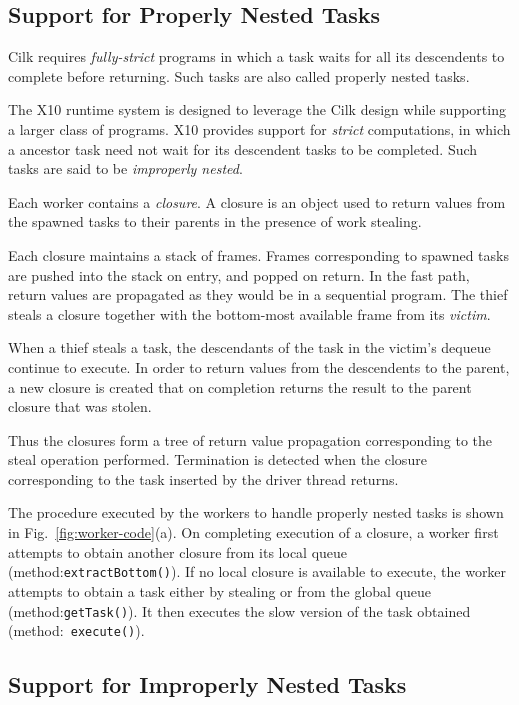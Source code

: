 \documentclass[10pt]{article}
\numberwithin{equation}{section}
\newcommand{\java}{\tt}
\def\Xten{{\sf X10}}
\begin{document}
\subsection{Support for Properly Nested Tasks}
Cilk requires {\em fully-strict} programs
in which a task waits for all its descendents to complete before
returning. Such tasks are also called properly nested tasks. 

The \Xten{} runtime system is designed to leverage the Cilk design while
supporting a larger class of programs. \Xten{} provides support for {\em
strict} computations, in which a ancestor task need not wait for its
descendent tasks to be completed. Such tasks are said to be {\em improperly
nested}. 

Each worker contains a {\em closure}. A closure is an  object used
to return values from the spawned tasks to their parents in the
presence of work stealing.  

Each closure maintains a stack of frames. Frames corresponding to
spawned tasks are pushed into the stack on entry, and popped on
return. In the fast path, return values are propagated as they would
be in a sequential program. The thief steals a closure together with
the bottom-most available frame from its
{\em victim}.

When a thief steals a task, the descendants of the task in the
victim's dequeue continue to execute.  In order to return values from
the descendents to the parent, a new closure is created that on
completion returns the result to the parent closure that was stolen.

Thus the closures form a tree of return value propagation
corresponding to the steal operation performed. Termination is
detected when the closure corresponding to the task inserted by the
driver thread returns. 

The procedure executed by the workers to handle properly nested tasks
is shown in Fig.~\ref{fig:worker-code}(a). On completing execution of
a closure, a worker first attempts to obtain another closure from its
local queue (method:{\java extractBottom()}). If no local closure is
available to execute, the worker attempts to obtain a task either by
stealing or from the global queue (method:{\java getTask()}). It then
executes the slow version of the task obtained (method:{\java
  execute()}). 


\subsection{Support for Improperly Nested Tasks}
\end{document}
